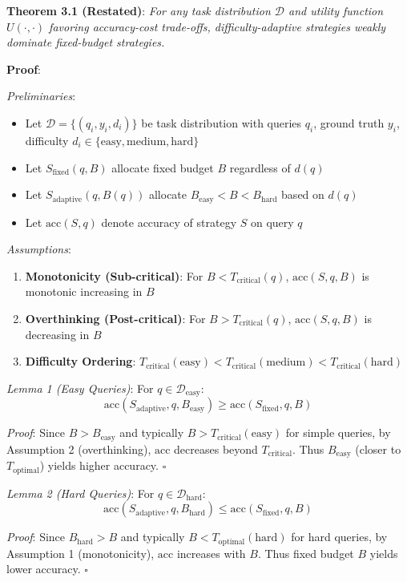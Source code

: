 \documentclass[10pt,preprint]{neurips_2024}
\begin{document}
\textbf{Theorem 3.1 (Restated)}: \textit{For any task distribution $\mathcal{D}$ and utility function $U(\cdot, \cdot)$ favoring accuracy-cost trade-offs, difficulty-adaptive strategies weakly dominate fixed-budget strategies.}

\textbf{Proof}:

\textit{Preliminaries}:
\begin{itemize}
    \item Let $\mathcal{D} = \{(q_i, y_i, d_i)\}$ be task distribution with queries $q_i$, ground truth $y_i$, difficulty $d_i \in \{\text{easy}, \text{medium}, \text{hard}\}$
    \item Let $S_{\text{fixed}}(q, B)$ allocate fixed budget $B$ regardless of $d(q)$
    \item Let $S_{\text{adaptive}}(q, B(q))$ allocate $B_{\text{easy}} < B < B_{\text{hard}}$ based on $d(q)$
    \item Let $\text{acc}(S, q)$ denote accuracy of strategy $S$ on query $q$
\end{itemize}

\textit{Assumptions}:
\begin{enumerate}
    \item \textbf{Monotonicity (Sub-critical)}: For $B < T_{\text{critical}}(q)$, $\text{acc}(S, q, B)$ is monotonic increasing in $B$
    \item \textbf{Overthinking (Post-critical)}: For $B > T_{\text{critical}}(q)$, $\text{acc}(S, q, B)$ is decreasing in $B$
    \item \textbf{Difficulty Ordering}: $T_{\text{critical}}(\text{easy}) < T_{\text{critical}}(\text{medium}) < T_{\text{critical}}(\text{hard})$
\end{enumerate}

\textit{Lemma 1 (Easy Queries)}: For $q \in \mathcal{D}_{\text{easy}}$:
$$\text{acc}(S_{\text{adaptive}}, q, B_{\text{easy}}) \geq \text{acc}(S_{\text{fixed}}, q, B)$$

\textit{Proof}: Since $B > B_{\text{easy}}$ and typically $B > T_{\text{critical}}(\text{easy})$ for simple queries, by Assumption 2 (overthinking), $\text{acc}$ decreases beyond $T_{\text{critical}}$. Thus $B_{\text{easy}}$ (closer to $T_{\text{optimal}}$) yields higher accuracy. $\square$

\textit{Lemma 2 (Hard Queries)}: For $q \in \mathcal{D}_{\text{hard}}$:
$$\text{acc}(S_{\text{adaptive}}, q, B_{\text{hard}}) \leq \text{acc}(S_{\text{fixed}}, q, B)$$

\textit{Proof}: Since $B_{\text{hard}} > B$ and typically $B < T_{\text{optimal}}(\text{hard})$ for hard queries, by Assumption 1 (monotonicity), $\text{acc}$ increases with $B$. Thus fixed budget $B$ yields lower accuracy. $\square$
\end{document}
